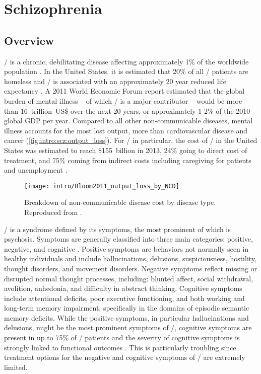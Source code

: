 \acresetall
\chapter{Schizophrenia}
\label{ch:intro:scz}
\section*{Overview}
\Scz/ is a chronic, debilitating disease affecting approximately 1\% of the worldwide population \citep{McGrath2008}.
In the United States, it is estimated that 20\% of all \scz/ patients are homeless and \scz/ is associated with an approximately 20 year reduced life expectancy \citep{Folsom2005, Tiihonen2009}.
A 2011 World Economic Forum report \citep{Bloom2011} estimated that the global burden of mental illness -- of which \scz/ is a major contributor -- would be more than 16~trillion~US\$ over the next 20 years, or approximately 1-2\% of the 2010 global GDP per year.
Compared to all other non-communicable diseases, mental illness accounts for the most lost output, more than cardiovascular disease and cancer (\autoref{fig:intro:scz:output_loss}).
For \scz/ in particular, the cost of \scz/ in the United States was estimated to reach \$155~billion in 2013, 24\% going to direct cost of treatment, and 75\% coming from indirect costs including caregiving for patients and unemployment \citep{Cloutier2016}. 
\begin{figure}
	\centering
	\texttt{[image: intro/Bloom2011\_output\_loss\_by\_NCD]}
	\caption[Breakdown of non-communicable disease cost by disease type]{Breakdown of non-communicable disease cost by disease type. Reproduced from \citet{Bloom2011}.}
	\label{fig:intro:scz:output_loss}
\end{figure}

\Scz/ is a syndrome defined by its symptoms, the most prominent of which is psychosis.
Symptoms are generally classified into three main categories: positive, negative, and cognitive \citep{Kay1982}.
Positive symptoms are behaviors not normally seen in healthy individuals and include hallucinations, delusions, suspiciousness, hostility, thought disorders, and movement disorders.
Negative symptoms reflect missing or disrupted normal thought processes, including: blunted affect, social withdrawal, avolition, anhedonia, and difficulty in abstract thinking.
Cognitive symptoms include attentional deficits, poor executive functioning, and both working and long-term memory impairment, specifically in the domains of episodic semantic memory deficits.
While the positive symptoms, in particular hallucinations and delusions, might be the most prominent symptoms of \scz/, cognitive symptoms are present in up to 75\% of \scz/ patients and the severity of cognitive symptoms is strongly linked to functional outcomes \citep{O'Carroll2000, Green1996, Keefe2007}.
This is particularly troubling since treatment options for the negative and cognitive symptoms of \scz/ are extremely limited.

